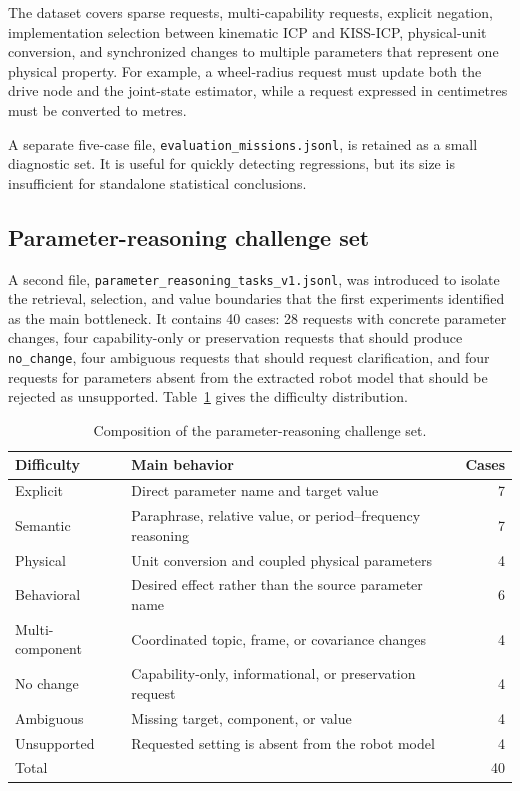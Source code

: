 The dataset covers sparse requests, multi-capability requests, explicit negation, implementation selection between kinematic ICP and KISS-ICP, physical-unit conversion, and synchronized changes to multiple parameters that represent one physical property. For example, a wheel-radius request must update both the drive node and the joint-state estimator, while a request expressed in centimetres must be converted to metres.

A separate five-case file, \texttt{evaluation\_missions.jsonl}, is retained as a small diagnostic set. It is useful for quickly detecting regressions, but its size is insufficient for standalone statistical conclusions.

\subsection{Parameter-reasoning challenge set}

A second file, \texttt{parameter\_reasoning\_tasks\_v1.jsonl}, was introduced to isolate the retrieval, selection, and value boundaries that the first experiments identified as the main bottleneck. It contains 40 cases: 28 requests with concrete parameter changes, four capability-only or preservation requests that should produce \texttt{no\_change}, four ambiguous requests that should request clarification, and four requests for parameters absent from the extracted robot model that should be rejected as unsupported. Table~\ref{tab:parameter-challenge-composition} gives the difficulty distribution.

\begin{table}[H]
\centering
\caption{Composition of the parameter-reasoning challenge set.}
\label{tab:parameter-challenge-composition}
\begin{tabular}{p{4.0cm}p{8.0cm}r}
\toprule
Difficulty & Main behavior & Cases \\
\midrule
Explicit & Direct parameter name and target value & 7 \\
Semantic & Paraphrase, relative value, or period--frequency reasoning & 7 \\
Physical & Unit conversion and coupled physical parameters & 4 \\
Behavioral & Desired effect rather than the source parameter name & 6 \\
Multi-component & Coordinated topic, frame, or covariance changes & 4 \\
No change & Capability-only, informational, or preservation request & 4 \\
Ambiguous & Missing target, component, or value & 4 \\
Unsupported & Requested setting is absent from the robot model & 4 \\
\midrule
Total & & 40 \\
\bottomrule
\end{tabular}
\end{table}

